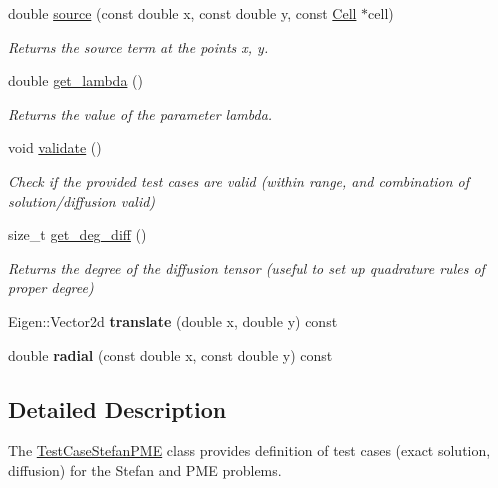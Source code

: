 \begin{DoxyCompactItemize}
double \hyperlink{classTestCaseStefanPME_a674169b5716f534375eabde0b5b2e7f3}{source} (const double x, const double y, const \hyperlink{classHArDCore2D_1_1Cell}{Cell} $\ast$cell)
\begin{DoxyCompactList}\small\item\em Returns the source term at the points x, y. \end{DoxyCompactList}\item 
double \hyperlink{group__TestCases_ga6a35b05916ba0fe5a3574778b597fab5}{get\+\_\+lambda} ()
\begin{DoxyCompactList}\small\item\em Returns the value of the parameter lambda. \end{DoxyCompactList}\item 
\mbox{\label{classTestCaseStefanPME_a5ee3e8ea52cb1168e65bc09619680e7e}} 
void \hyperlink{classTestCaseStefanPME_a5ee3e8ea52cb1168e65bc09619680e7e}{validate} ()
\begin{DoxyCompactList}\small\item\em Check if the provided test cases are valid (within range, and combination of solution/diffusion valid) \end{DoxyCompactList}\item 
size\+\_\+t \hyperlink{group__TestCases_gad12abb16eefb6bbc83b2668dcfab4cee}{get\+\_\+deg\+\_\+diff} ()
\begin{DoxyCompactList}\small\item\em Returns the degree of the diffusion tensor (useful to set up quadrature rules of proper degree) \end{DoxyCompactList}\item 
\mbox{\label{classTestCaseStefanPME_a80a585412b30c38dc1c257179894c445}} 
Eigen\+::\+Vector2d {\bfseries translate} (double x, double y) const
\item 
\mbox{\label{classTestCaseStefanPME_a5df8bcc38342baba9fc8763ee2f4adee}} 
double {\bfseries radial} (const double x, const double y) const
\end{DoxyCompactItemize}


\subsection{Detailed Description}
The \hyperlink{classTestCaseStefanPME}{Test\+Case\+Stefan\+P\+ME} class provides definition of test cases (exact solution, diffusion) for the Stefan and P\+ME problems. 

